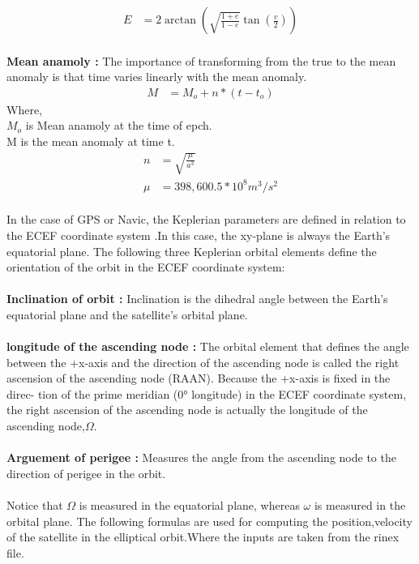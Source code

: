 \documentclass[10pt]{book}
\begin{document}
 \begin{align}
E&=2\arctan (\sqrt{\frac{1+e}{1-e}}\tan(\frac{v}{2})  )
 \end{align}
 \\
 \textbf{Mean anamoly :} The importance of transforming from the true to the mean
 anomaly is that time varies linearly with the mean anomaly.\\
 \begin{align}
  M&=M_o+n*(t-t_o)
 \end{align}
 Where,\\
 $M_o$ is Mean anamoly at the time of epch.\\
 M is the mean anomaly at time t.\\
 \begin{align}
  n&=\sqrt{\frac{\mu }{a^3}} \\
  \mu&=398,600.5 * 10^8 m^3/s^2
 \end{align} 
 \\
 In the case of GPS or Navic, the Keplerian
parameters are defined in relation to the ECEF coordinate system .In this case, the xy-plane is always the Earth's equatorial plane.
The following three Keplerian orbital elements define the orientation of the orbit in the
ECEF coordinate system:\\
\\
\textbf{Inclination of orbit :} Inclination is the dihedral angle between the Earth’s equatorial plane and the
satellite’s orbital plane.\\
\\
\textbf{longitude of the ascending node :} The orbital element that defines the
angle between the +x-axis and the direction of the ascending node is called the right
ascension of the ascending node (RAAN). Because the +x-axis is fixed in the direc-
tion of the prime meridian (0° longitude) in the ECEF coordinate system, the right
ascension of the ascending node is actually the longitude of the ascending node,$\Omega$.\\
\\
\textbf{Arguement of perigee :} Measures the angle
from the ascending node to the direction of perigee in the orbit. \\
\\
Notice that $\Omega$ is measured in the equatorial plane, whereas $\omega$ is measured in the orbital plane.
The following formulas are used for computing the position,velocity of the satellite in the elliptical orbit.Where the inputs are taken from the rinex file.
\end{document}
